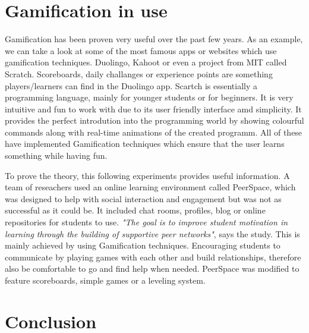 \documentclass[10pt,english,a4paper]{article}
\begin{document}
\section{Gamification in use} \label{section4}
	Gamification has been proven very useful over the past few years.
	As an example, we can take a look at some of the most famous apps or websites which use gamification techniques. Duolingo, Kahoot or even a project from MIT called Scratch. 
	Scoreboards, daily challanges or experience points are something players/learners can find in the Duolingo app.
	Scartch is essentially a programming language, mainly for younger students or for beginners. It is very intuitive and fun to work with due to its user friendly interface amd simplicity.
	It provides the perfect introdution into the programming world by showing colourful commands along with real-time animations of the created programm.
	All of these have implemented Gamification techniques which ensure that the user learns something while having fun.

	To prove the theory, this following experiments provides useful information. A team of reseachers used an online learning environment called PeerSpace, which was designed to help with social interaction and engagement but was not as successful as it could be.
	It included chat rooms, profiles, blog or online repositories for students to use. 
	\textit{"The goal is to improve student motivation in learning through the building of supportive peer networks"}, says the study.
	This is mainly achieved by using Gamification techniques. Encouraging students to communicate by playing games with each other and build relationships, therefore also be comfortable to go and find help when needed.
	PeerSpace was modified to feature scoreboards, simple games or a leveling system. 



\section{Conclusion} \label{section5}





\end{document}
